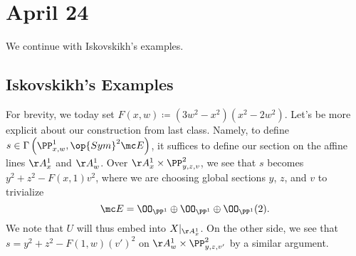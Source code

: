 \documentclass[../notes.tex]{subfiles}
\begin{document}
\section{April 24}

We continue with Iskovskikh's examples.

\subsection{Iskovskikh's Examples}
For brevity, we today set $F(x,w)\coloneqq\left(3w^2-x^2\right)\left(x^2-2w^2\right)$. Let's be more explicit about our construction from last class. Namely, to define $s\in\Gamma\left(\PP^1_{x,w},\op{Sym}^2\mc E\right)$, it suffices to define our section on the affine lines $\AA^1_x$ and $\AA^1_w$. Over $\AA^1_x\times\PP^2_{y,z,v}$, we see that $s$ becomes $y^2+z^2-F(x,1)v^2$, where we are choosing global sections $y$, $z$, and $v$ to trivialize
\[\mc E=\OO_{\PP^1}\oplus\OO_{\PP^1}\oplus\OO_{\PP^1}(2).\]
We note that $U$ will thus embed into $X|_{\AA^1_x}$. On the other side, we see that $s=y^2+z^2-F(1,w)(v')^2$ on $\AA^1_w\times\PP^2_{y,z,v'}$ by a similar argument.
\end{document}
